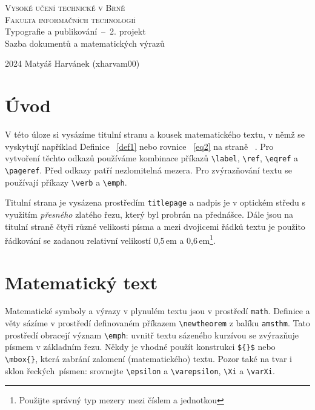 \documentclass[a4paper, twocolumn, 11pt]{article}
\begin{document}
\newtheorem{definition}{Definice}

\begin{titlepage}
    \begin{center}
    \Huge \textsc{Vysoké učení technické v Brně} \\
    \vspace{0.5em}
    \huge \textsc{Fakulta informačních technologií} \\
    \LARGE Typografie a publikování \,--\, 2. projekt \\
    \vspace{0.6em}
    Sazba dokumentů a matematických výrazů 
    \end{center}
    {\Large 2024 \hfill Matyáš Harvánek (xharvam00)}
\end{titlepage}

\newpage
\section*{Úvod}
\par V této úloze si vysázíme titulní stranu a kousek matematického textu, v němž se vyskytují například Definice ~\ref{def1} nebo rovnice ~\eqref{eq2} na straně ~\pageref{eq2}. Pro vytvoření těchto odkazů používáme kombinace příkazů 
\verb|\label|,
\verb|\ref|, 
\verb|\eqref| a 
\verb|\pageref|. Před odkazy patří nezlomitelná mezera. Pro zvýrazňování textu se používají příkazy 
\verb|\verb| a 
\verb|\emph|.
\par Titulní strana je vysázena prostředím 
\verb|titlepage| a nadpis je v optickém středu s využitím 
\emph{přesného} zla\-tého řezu, který byl probrán na přednášce. Dále jsou na titulní straně čtyři různé velikosti písma a mezi dvojicemi řádků textu je použito řádkování se zadanou relativní velikostí 0,5\,em a 0,6\,em\footnote{Použijte správný typ mezery mezi číslem a jednotkou}.

\section{Matematický text}
\par Matematické symboly a výrazy v plynulém textu jsou v prostředí 
\verb|math|. Definice a věty sázíme v prostředí definovaném příkazem 
\verb|\newtheorem| z balíku 
\verb|amsthm|. Tato prostředí obracejí význam 
\verb|\emph|: uvnitř textu sázeného kurzívou se zvýrazňuje písmem v základním řezu. Někdy je vhodné použít konstrukci 
\verb|${}$| nebo 
\verb|\mbox{}|, která zabrání zalomení (matematic\-kého) textu. Pozor také na tvar i sklon řeckých~písmen: srovnejte 
\verb|\epsilon| a 
\verb|\varepsilon|, 
\verb|\Xi| a 
\verb|\varXi|.
\end{document}
